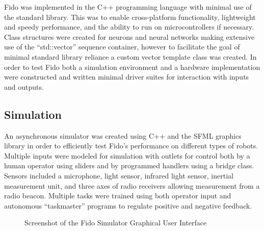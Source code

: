 Fido was implemented in the C++ programming language with minimal use of the standard library.
This was to enable cross-platform functionality, lightweight and speedy performance, and the ability to run on microcontrollers if necessary.
Class structures were created for neurons and neural networks making extensive use of the ``std::vector'' sequence container, however to facilitate the goal of minimal standard library reliance a custom vector template class was created.
In order to test Fido both a simulation environment and a hardware implementation were constructed and written minimal driver suites for interaction with inputs and outputs.


\subsection{Simulation}

An asynchronous simulator was created using C++ and the SFML graphics library in order to efficiently test Fido's performance on different types of robots.
Multiple inputs were modeled for simulation with outlets for control both by a human operator using sliders and by programmed handlers using a bridge class.
Sensors included a microphone, light sensor, infrared light sensor, inertial measurement unit, and three axes of radio receivers allowing measurement from a radio beacon.
Multiple tasks were trained using both operator input and autonomous ``taskmaster'' programs to regulate positive and negative feedback.


\begin{figure}
	\centering
	\caption{Screenshot of the Fido Simulator Graphical User Interface}
\end{figure}

